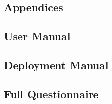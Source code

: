 \documentclass{l4proj}
\begin{document}
%
% 

\begin{appendices}

\chapter{Appendices}

\section{User Manual}

\section{Deployment Manual}

\section{Full Questionnaire}


\end{appendices}






\end{document}

